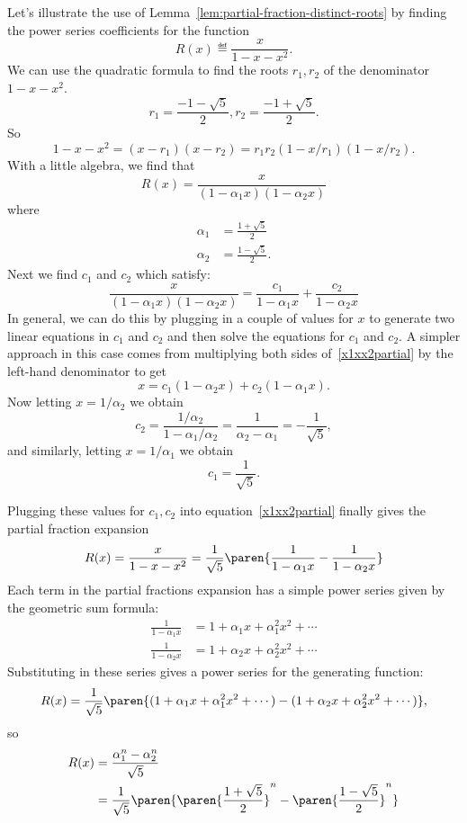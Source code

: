 Let's illustrate the use of Lemma~\ref{lem:partial-fraction-distinct-roots}
by finding the power series coefficients for the function
\[
R(x) \eqdef \frac{x}{1 - x - x^2}.
\]
We can use the quadratic formula to find the roots $r_1,r_2$ of the denominator $1 - x - x^2$.
\[
r_1 = \frac{-1 -\sqrt{5}}{2}, r_2 = \frac{-1 + \sqrt{5}}{2}.
\]
So
\[
1 - x - x^2 = (x - r_1)(x - r_2) = r_1r_2(1-x/r_1)(1-x/r_2).
\]
With a little algebra, we find that
\[
R(x) = \frac{x}{(1-\alpha_1 x)(1-\alpha_2 x)}
\]
where
\begin{align*}
\alpha_1 & = \frac{1 + \sqrt{5}}{2}\\
\alpha_2 & = \frac{1 - \sqrt{5}}{2}.
\end{align*}
Next we find $c_1$ and $c_2$ which satisfy:
\begin{equation}\label{x1xx2partial}
\frac{x}{(1-\alpha_1 x)(1-\alpha_2 x)} =
      \frac{c_1}{1 - \alpha_1 x} + \frac{c_2}{1 - \alpha_2 x}
\end{equation}
In general, we can do this by plugging in a couple of values for $x$
to generate two linear equations in $c_1$ and $c_2$ and then solve the
equations for $c_1$ and $c_2$.  A simpler approach in this case comes
from multiplying both sides of~\eqref{x1xx2partial} by the left-hand
denominator to get
\[
x = c_1(1 - \alpha_2 x) + c_2(1 - \alpha_1 x).
\]
Now letting $x = 1/\alpha_2$ we obtain
\[
c_2 = \frac{1/\alpha_2}{1-\alpha_1/\alpha_2} = \frac{1}{\alpha_2 - \alpha_1} = -\frac{1}{\sqrt{5}},
\]
and similarly, letting $x = 1/\alpha_1$ we obtain
\[
c_1 =\frac{1}{\sqrt{5}}.
\]
\iffalse
\begin{gather*}
c_1 = \frac{1}{\alpha_1 - \alpha_2} = \frac{1}{\sqrt{5}} \\
c_2 = \frac{-1}{\alpha_1 - \alpha_2} = -\frac{1}{\sqrt{5}}
\end{gather*}
\fi
Plugging these values for $c_1,c_2$ into
equation~\eqref{x1xx2partial} finally gives the partial fraction
expansion
%
\[
R(x) = \frac{x}{1 - x - x^2} =
      \frac{1}{\sqrt{5}}
      \paren{\frac{1}{1 - \alpha_1 x} - \frac{1}{1 - \alpha_2 x}}
\]
%
Each term in the partial fractions expansion has a simple power series
given by the geometric sum formula:
%
\begin{align*}
\frac{1}{1 - \alpha_1 x} & = 1 + \alpha_1 x + \alpha_1^2 x^2 + \cdots \\
\frac{1}{1 - \alpha_2 x} & = 1 + \alpha_2 x + \alpha_2^2 x^2 + \cdots
\end{align*}
%
Substituting in these series gives a power series for the generating
function:
%
\[
R(x)  =  \frac{1}{\sqrt{5}}
      \paren{(1 + \alpha_1 x + \alpha_1^2 x^2 + \cdots) -
      (1 + \alpha_2 x + \alpha_2^2 x^2 + \cdots)},
\]
so
\begin{align}
 [x^n]R(x) & = \frac{\alpha_1^n - \alpha_2^n}{\sqrt{5}} \notag \\
           & = \frac{1}{\sqrt{5}}
      \paren{
      \paren{\frac{1 + \sqrt{5}}{2}}^n -
      \paren{\frac{1 - \sqrt{5}}{2}}^n
      }     \label{fib-coeff}
\end{align}

